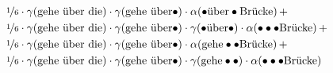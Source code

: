 \documentclass[11pt,a4paper]{article}
\begin{document}
\begin{equation}
\begin{split}
    &\nicefrac{1}{6} \cdot \gamma(\text{gehe \"uber die}) \cdot \gamma(\text{gehe \"uber}\bullet) \cdot \alpha(\bullet\text{\"uber}\bullet\text{Br\"ucke}) \, + \\
    &\nicefrac{1}{6} \cdot \gamma(\text{gehe \"uber die}) \cdot \gamma(\text{gehe \"uber}\bullet) \cdot \gamma(\bullet\text{\"uber}\bullet) \cdot \alpha(\bullet\bullet\bullet\text{Br\"ucke}) \, + \\
    &\nicefrac{1}{6} \cdot \gamma(\text{gehe \"uber die}) \cdot \gamma(\text{gehe \"uber}\bullet) \cdot \alpha(\text{gehe}\bullet\bullet\text{Br\"ucke}) \, + \\
    &\nicefrac{1}{6} \cdot \gamma(\text{gehe \"uber die}) \cdot \gamma(\text{gehe \"uber}\bullet) \cdot \gamma(\text{gehe}\bullet\bullet) \cdot \alpha(\bullet\bullet\bullet\text{Br\"ucke})
  \end{split}
\end{equation}
\end{document}
